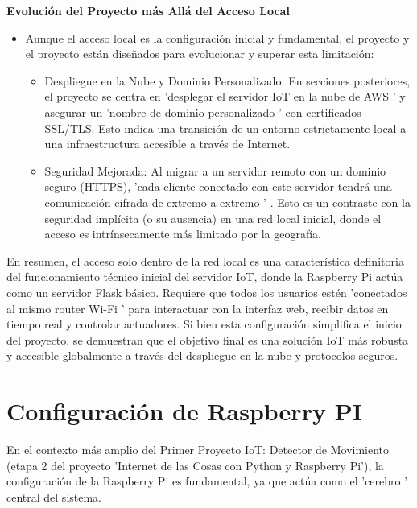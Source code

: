 \documentclass{report}
\begin{document}
\textbf{Evolución del Proyecto más Allá del Acceso Local}
\begin{itemize}
\item Aunque el acceso local es la configuración inicial y fundamental, el proyecto y el proyecto están diseñados para evolucionar y superar esta limitación:
    \begin{itemize}
        \item Despliegue en la Nube y Dominio Personalizado:  En secciones posteriores, el proyecto se centra en   'desplegar el servidor IoT en la nube 
        de AWS '  y asegurar un   'nombre de dominio personalizado '  con certificados SSL/TLS. Esto indica una transición de un entorno estrictamente 
        local a una infraestructura accesible a través de Internet.
        \item Seguridad Mejorada:  Al migrar a un servidor remoto con un dominio seguro (HTTPS),   'cada cliente conectado con este servidor tendrá una 
        comunicación cifrada de extremo a extremo ' . Esto es un contraste con la seguridad implícita (o su ausencia) en una red local inicial, 
        donde el acceso es intrínsecamente más limitado por la geografía.
    \end{itemize}
\end{itemize}
En resumen, el  acceso solo dentro de la red local  es una característica definitoria del  funcionamiento técnico inicial  del servidor IoT, donde 
la Raspberry Pi actúa como un servidor Flask básico. Requiere que todos los usuarios estén   'conectados al mismo router Wi-Fi '  para interactuar 
con la interfaz web, recibir datos en tiempo real y controlar actuadores. Si bien esta configuración simplifica el inicio del proyecto, se  
demuestran que el objetivo final es una solución IoT más robusta y accesible globalmente a través del despliegue en la nube y protocolos seguros.

\section{Configuración de Raspberry PI}
En el contexto más amplio del  Primer Proyecto IoT: Detector de Movimiento  (etapa 2 del proyecto  'Internet de las Cosas con Python y Raspberry Pi'), 
la configuración de la Raspberry Pi es fundamental, ya que actúa como el  'cerebro ' central del sistema.
\end{document}
